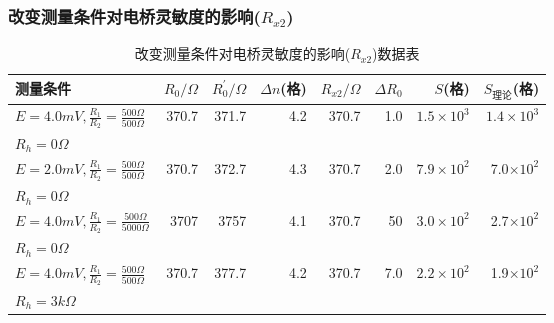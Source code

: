 \documentclass[a4 paper,12pt]{article}
\begin{document}
\subsubsection{改变测量条件对电桥灵敏度的影响($R_{x2}$)}
\begin{table}[H]
	\centering
	\caption{改变测量条件对电桥灵敏度的影响($R_{x2}$)数据表}
	\begin{tabular}{|l|r|r|r|r|r|r|r|}
		\hline
		测量条件&$R_{0}/\Omega$&$R^{\prime}_{0}/\Omega$&$\Delta n$(格)&$R_{x2}/\Omega$&$\Delta R_{0}$&$S$(格)&$S_{\text{理论}}$(格)\\
		\hline
		$E=4.0mV,\frac{R_{1}}{R_{2}}=\frac{500\Omega}{500\Omega}$&\multirow{2}{*}{370.7}&\multirow{2}{*}{371.7}&\multirow{2}{*}{4.2}&\multirow{2}{*}{370.7}&\multirow{2}{*}{1.0}&\multirow{2}{*}{$1.5\times10^{3}$}&\multirow{2}{*}{$1.4\times10^{3}$}\\
		$R_{h}=0\Omega$&&&&&&&\\
		\hline
		$E=2.0mV,\frac{R_{1}}{R_{2}}=\frac{500\Omega}{500\Omega}$&\multirow{2}{*}{370.7}&\multirow{2}{*}{372.7}&\multirow{2}{*}{4.3}&\multirow{2}{*}{370.7}&\multirow{2}{*}{2.0}&\multirow{2}{*}{$7.9\times10^{2}$}&\multirow{2}{*}{7.0$\times10^{2}$}\\
        $R_{h}=0\Omega$&&&&&&&\\
        \hline
        $E=4.0mV,\frac{R_{1}}{R_{2}}=\frac{500\Omega}{5000\Omega}$&\multirow{2}{*}{3707}&\multirow{2}{*}{3757}&\multirow{2}{*}{4.1}&\multirow{2}{*}{370.7}&\multirow{2}{*}{50}&\multirow{2}{*}{$3.0\times10^{2}$}&\multirow{2}{*}{2.7$\times10^{2}$}\\
        $R_{h}=0\Omega$&&&&&&&\\
        \hline
        $E=4.0mV,\frac{R_{1}}{R_{2}}=\frac{500\Omega}{500\Omega}$&\multirow{2}{*}{370.7}&\multirow{2}{*}{377.7}&\multirow{2}{*}{4.2}&\multirow{2}{*}{370.7}&\multirow{2}{*}{7.0}&\multirow{2}{*}{$2.2\times10^{2}$}&\multirow{2}{*}{1.9$\times10^{2}$}\\
        $R_{h}=3k\Omega$&&&&&&&\\
        \hline
	\end{tabular}
\end{table}
\end{document}
